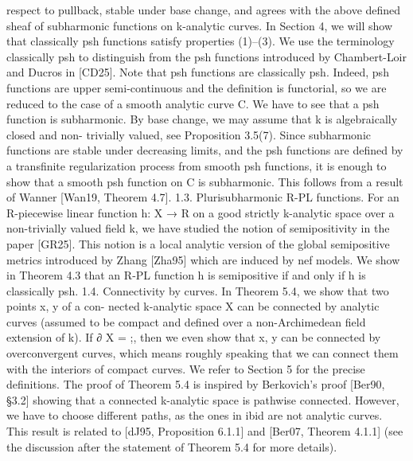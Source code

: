 \documentclass[
  10pt,
]{article}
\newenvironment{Shaded}{}{}
\newcommand{\NormalTok}[1]{#1}
\begin{document}
\begin{Shaded}
\begin{Highlighting}[]
\NormalTok{respect to pullback, stable under base change, and agrees with the above defined sheaf}
\NormalTok{of subharmonic functions on k{-}analytic curves. In Section 4, we will show that classically}
\NormalTok{psh functions satisfy properties (1)–(3).}
\NormalTok{   We use the terminology classically psh to distinguish from the psh functions introduced}
\NormalTok{by Chambert{-}Loir and Ducros in [CD25]. Note that psh functions are classically psh.}
\NormalTok{Indeed, psh functions are upper semi{-}continuous and the definition is functorial, so we}
\NormalTok{are reduced to the case of a smooth analytic curve C. We have to see that a psh function}
\NormalTok{is subharmonic. By base change, we may assume that k is algebraically closed and non{-}}
\NormalTok{trivially valued, see Proposition 3.5(7). Since subharmonic functions are stable under}
\NormalTok{decreasing limits, and the psh functions are defined by a transfinite regularization process}
\NormalTok{from smooth psh functions, it is enough to show that a smooth psh function on C is}
\NormalTok{subharmonic. This follows from a result of Wanner [Wan19, Theorem 4.7].}
\NormalTok{1.3. Plurisubharmonic R{-}PL functions. For an R{-}piecewise linear function h: X → R}
\NormalTok{on a good strictly k{-}analytic space over a non{-}trivially valued field k, we have studied the}
\NormalTok{notion of semipositivity in the paper [GR25]. This notion is a local analytic version of}
\NormalTok{the global semipositive metrics introduced by Zhang [Zha95] which are induced by nef}
\NormalTok{models. We show in Theorem 4.3 that an R{-}PL function h is semipositive if and only if h}
\NormalTok{is classically psh.}
\NormalTok{1.4. Connectivity by curves. In Theorem 5.4, we show that two points x, y of a con{-}}
\NormalTok{nected k{-}analytic space X can be connected by analytic curves (assumed to be compact}
\NormalTok{and defined over a non{-}Archimedean field extension of k). If ∂ X = ;, then we even show}
\NormalTok{that x, y can be connected by overconvergent curves, which means roughly speaking that}
\NormalTok{we can connect them with the interiors of compact curves. We refer to Section 5 for the}
\NormalTok{precise definitions. The proof of Theorem 5.4 is inspired by Berkovich’s proof [Ber90,}
\NormalTok{§3.2] showing that a connected k{-}analytic space is pathwise connected. However, we}
\NormalTok{have to choose different paths, as the ones in ibid are not analytic curves. This result is}
\NormalTok{related to [dJ95, Proposition 6.1.1] and [Ber07, Theorem 4.1.1] (see the discussion after}
\NormalTok{the statement of Theorem 5.4 for more details).}

\end{Highlighting}
\end{Shaded}
\end{document}
